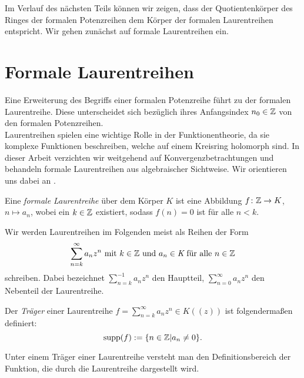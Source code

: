 %
%
%
%
%
%
%
%
%
%
%
%
%
Im Verlauf des nächsten Teils können wir zeigen, dass der Quotientenkörper des Ringes der formalen Potenzreihen dem Körper der formalen Laurentreihen entspricht. Wir gehen zunächst auf formale Laurentreihen ein.
%
%
%
%
\section{Formale Laurentreihen}
%
Eine Erweiterung des Begriffs einer formalen Potenzreihe führt zu der formalen Laurentreihe. Diese unterscheidet sich bezüglich ihres Anfangsindex $n_0 \in \mathbb{Z}$ von den formalen Potenzreihen. \\
Laurentreihen spielen eine wichtige Rolle in der Funktionentheorie, da sie komplexe Funktionen beschreiben, welche auf einem Kreisring holomorph sind. In dieser Arbeit verzichten wir weitgehend auf Konvergenzbetrachtungen und behandeln formale Laurentreihen aus algebraischer Sichtweise. %
Wir orientieren uns dabei an \cite[S. 563 - 572]{Lueneburg08}.
%
\begin{defn}
Eine \textit{formale Laurentreihe} über dem Körper $K$ ist eine Abbildung $f \colon \mathbb{Z} \rightarrow K$, $n \mapsto a_n$, wobei ein $k\in \mathbb{Z}$ existiert, sodass $f(n) = 0$ ist für alle $n < k$.
\end{defn}
%
%
\begin{nota}
Wir werden Laurentreihen im Folgenden meist als Reihen der Form
\begin{equation*}
\sum_{n= k}^{\infty}a_nz^n \text{ mit } k \in \mathbb{Z} \text{ und }a_n \in\textit{K}\text{ für alle } n\in\mathbb{Z} 
\end{equation*} 
schreiben.
Dabei bezeichnet $\sum_{n=k}^{-1}a_{n}z^{n}$ den Hauptteil, $\sum_{n=0}^{\infty}a_nz^n$ den Nebenteil der Laurentreihe. 
\end{nota}
%
%
%
%
%
%
%
%
%
%
% 
\begin{defn}\label{traeger}
Der \textit{Träger} einer Laurentreihe $f = \sum_{n =k}^{\infty} a_nz^n \in K((z))$ ist folgendermaßen definiert: 
\[\text{supp}(f) := \lbrace n \in \mathbb{Z} | a_n \neq 0 \rbrace.\] 
\end{defn}
%
%
%
%
\newpage
\begin{bem}
Unter einem Träger einer Laurentreihe versteht man den Definitionsbereich der Funktion, die durch die Laurentreihe dargestellt wird.
\end{bem}
%
%
%
%
